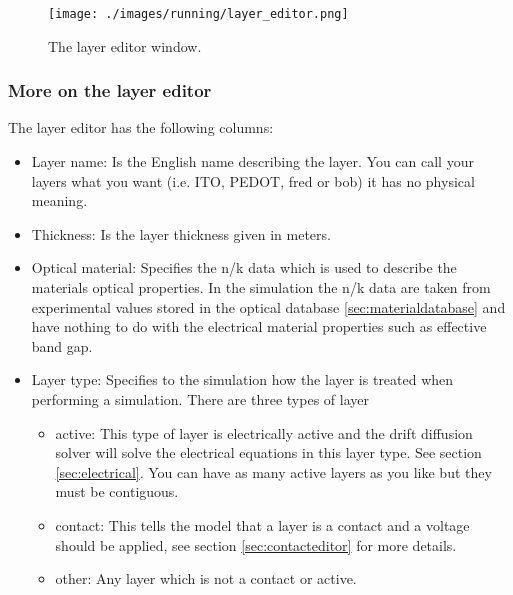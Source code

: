 \begin{figure}[H]
\centering
\texttt{[image: ./images/running/layer\_editor.png]}
\caption{The layer editor window.}
\label{fig:layereditor}
\end{figure}

\vspace*{\fill}

\newpage
\subsubsection{More on the layer editor}
The layer editor has the following columns:

\begin{itemize}
  \item Layer name: Is the English name describing the layer. You can call your layers what you want (i.e. ITO, PEDOT, fred or bob) it has no physical meaning.
  \item Thickness: Is the layer thickness given in meters.
  \item Optical material: Specifies the n/k data which is used to describe the materials optical properties. In the simulation the n/k data are taken from experimental values stored in the optical database \ref{sec:materialdatabase} and have nothing to do with the electrical material properties such as effective band gap.
  \item Layer type: Specifies to the simulation how the layer is treated when performing a simulation. There are three types of layer
	\begin{itemize}
	  \item active: This type of layer is electrically active and the drift diffusion solver will solve the electrical equations in this layer type. See section \ref{sec:electrical}. You can have as many active layers as you like but they must be contiguous.
 	  \item contact: This tells the model that a layer is a contact and a voltage should be applied, see section \ref{sec:contacteditor} for more details.
 	  \item other: Any layer which is not a contact or active.

	\end{itemize}
\end{itemize}

